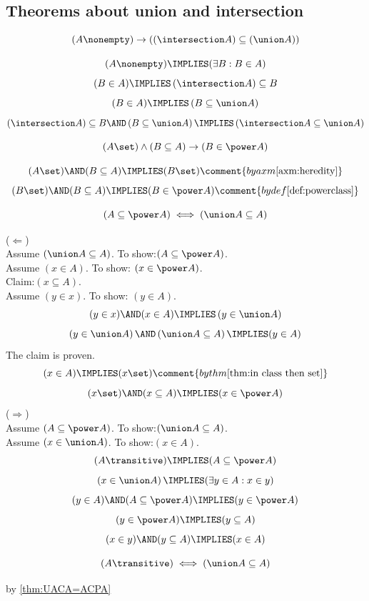 \subsection{Theorems about union and intersection}
\begin{theorem}
\label{thm:intersection of nonempty is subset of union}
\[
(A \nonempty) \rightarrow \left(\left(\intersection A\right)\subseteq \left(\union A\right)\right)
\]
\end{theorem}
\Proof
\[
(A \nonempty)
\IMPLIES
(\exists B:B\in A)
\]
\[
(B\in A)
\IMPLIES
\left(\intersection A\right)\subseteq B
\]
\[
(B\in A)
\IMPLIES
\left(B \subseteq \union A\right)
\]
\[
\left(\intersection A\right)\subseteq B
\AND
\left(B \subseteq \union A\right)
\IMPLIES
\left(\intersection A \subseteq \union A\right)
\]
\Done

\begin{theorem}
\[
(A\set) \land (B\subseteq A) \rightarrow (B\in\power A)
\]
\end{theorem}
\Proof
\[
(A\set) \AND (B\subseteq A) \IMPLIES (B\set)
\comment{by axm \ref{axm:heredity}}
\]
\[
(B\set) \AND (B\subseteq A) \IMPLIES (B\in\power A)
\comment{by def \ref{def:powerclass}}
\]
\Done


\begin{theorem}
\label{thm:UACA=ACPA}
\[
(A\subseteq \power A) \iff \left(\union A\subseteq A\right)
\]
\end{theorem}
\Proof
\noindent($\Leftarrow$)\\
Assume $(\union A\subseteq A)$. To show:$(A\subseteq \power A)$.\\
Assume $(x\in A)$. To show: $(x\in \power A)$.\\
Claim:$(x\subseteq A)$.\\
Assume $(y\in x)$. To show: $(y\in A)$.\\
\[
(y\in x)
\AND
(x\in A)
\IMPLIES
\left(y\in\union A\right)
\]
\[
\left(y\in\union A\right)
\AND
\left(\union A\subseteq A\right)
\IMPLIES
(y\in A)
\]
The claim is proven.
\[
(x\in A)
\IMPLIES
(x\set)
\comment{by thm \ref{thm:in class then set}}
\]
\[
(x\set)
\AND
(x\subseteq A)
\IMPLIES
(x\in\power A)
\]
\noindent($\Rightarrow$)\\
Assume $(A\subseteq \power A)$. To show:$(\union A\subseteq A)$.\\
Assume $(x\in\union A)$. To show:$(x\in A)$.
\[
(A \transitive)
\IMPLIES
(A\subseteq \power A)
\]
\[
\left(x\in\union A\right)
\IMPLIES
(\exists y\in A: x\in y)
\]
\[
(y\in A)
\AND
(A\subseteq \power A)
\IMPLIES
(y\in \power A)
\]
\[
(y\in \power A)
\IMPLIES
(y\subseteq A)
\]
\[
(x\in y)
\AND
(y\subseteq A)
\IMPLIES
(x\in A)
\]
\Done
\begin{theorem}
\label{thm:transitive through union}
\[
\left(A \transitive\right)\iff \left(\union A\subseteq A\right)
\]
\end{theorem}
\Proof
by \ref{thm:UACA=ACPA}\\
\Done


